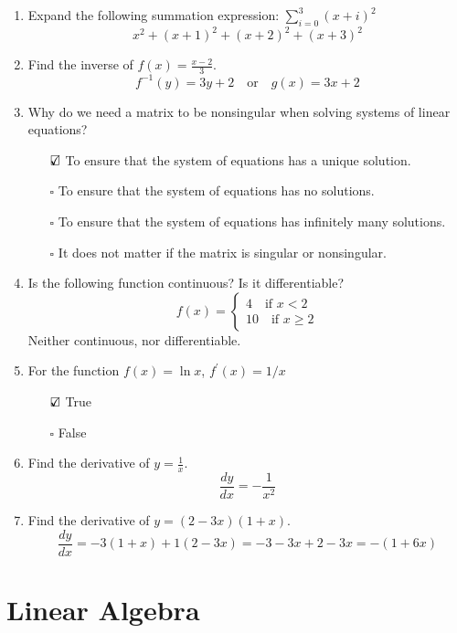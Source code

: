 \documentclass{./../../Latex/tests}
\begin{document}
\begin{enumerate}
\item Expand the following summation expression: $\sum_{i=0}^{3}(x+i)^{2}$
$$ x^2 + (x+1)^2 + (x+2)^2 + (x+3)^2 $$

\item Find the inverse of $f(x) = \frac{x-2}{3}$.
$$ f^{-1}(y) = 3y+2 \quad \text{or} \quad g(x) =3x+2 $$

\item Why do we need a matrix to be nonsingular when solving systems of linear equations?
\begin{itemize}
\item[$\text{\rlap{$\checkmark$}}\square$] To ensure that the system of equations has a unique solution.
\item[$\square$] To ensure that the system of equations has no solutions.
\item[$\square$] To ensure that the system of equations has infinitely many solutions.
\item[$\square$] It does not matter if the matrix is singular or nonsingular.  \\
\end{itemize}

\item Is the following function continuous? Is it differentiable?
$$ f(x) = \begin{cases}
4 \quad \text{if } x<2 \\
10 \quad \text{if } x\geq2
\end{cases} $$
Neither continuous, nor differentiable. \\

\item For the function $f(x) = \ln x$, $f^{\prime} (x)=1/x$ 
\begin{itemize}
\item[$\text{\rlap{$\checkmark$}}\square$] True 
\item[$\square$] False \\
\end{itemize}  
\item Find the derivative of $y = \frac{1}{x}$.
$$ \frac{dy}{dx} =-\frac{1}{x^2} $$
\item Find the derivative of $y = (2-3x)(1+x)$.
$$ \frac{dy}{dx} =-3(1+x)+1(2-3x) = -3-3x+2-3x = -(1+6x) $$
\end{enumerate}

\newpage
\section{Linear Algebra}
\end{document}
